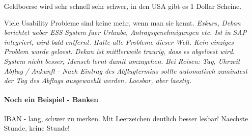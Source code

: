 Geldboerse wird sehr schnell sehr schwer, in den USA gibt es 1 Dollar Scheine.

Viele Usability Probleme sind keine mehr, wenn man sie kennt. \textit{Exkurs, Dekan 
berichtet ueber ESS System fuer Urlaube, Antragsgenehmigungen etc. Ist in SAP integriert,
wird bald entfernt. Hatte alle Probleme dieser Welt. Kein einziges Problem wurde geloest.
Dekan ist mittlerweile traurig, dass es abgeloest wird. System nicht besser, Mensch lernt
damit umzugehen. Bei Reisen: Tag, Uhrzeit Abflug / Ankunft - Nach Eintrag des Abflugtermins
sollte automatisch zumindest der Tag des Abflugs ausgewaehlt werden. Loesbar, aber laestig.}

\paragraph{Noch ein Beispiel - Banken}
IBAN - lang, schwer zu merken. Mit Leerzeichen deutlich besser lesbar!
Naechste Stunde, keine Stunde!

